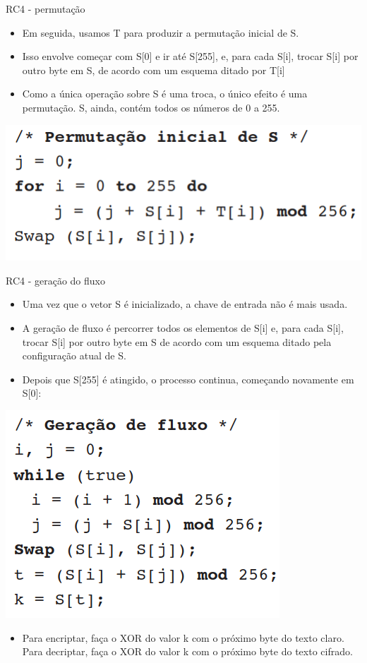 \begin{frame}{RC4 - permutação}
\begin{itemize}


     \item    Em seguida, usamos T para produzir a permutação inicial de S. 
         \item Isso envolve começar com S[0] e ir até
S[255], e, para cada S[i], trocar S[i] por outro byte em S, de acordo com um esquema ditado por T[i]
\item Como a única operação sobre S é uma troca, o único efeito é uma permutação. S, ainda, contém todos os
números de 0 a 255.

  \end{itemize}  
  
  \includegraphics[width=\linewidth]{Figuras/rc4-permutacao-inicial.png}



\end{frame}

\begin{frame}{RC4 - geração do fluxo}
\begin{itemize}


     \item    Uma vez que o vetor S é inicializado, a chave de entrada não é mais usada. 
          \item A geração de fluxo é percorrer todos os elementos de S[i] e, para cada S[i], trocar S[i] por outro byte em S de acordo com um esquema
ditado pela configuração atual de S. 

     \item Depois que S[255] é atingido, o processo continua, começando novamente
em S[0]:

  \end{itemize}  
  
  \centering
  \includegraphics[width=0.4\linewidth]{Figuras/rc4-geracao-de-fluxo.png}

\begin{itemize}
    \item Para encriptar, faça o XOR do valor k com o próximo byte do texto claro. Para decriptar, faça o XOR do
valor k com o próximo byte do texto cifrado.
\end{itemize}

\end{frame}


